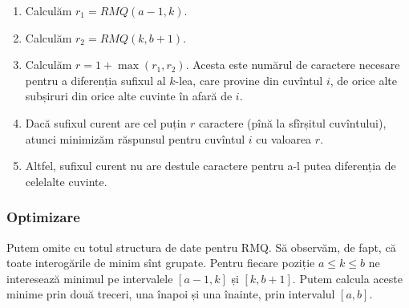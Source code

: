 \documentclass[../main.tex]{subfiles}
\begin{document}
\begin{enumerate}
  \item Calculăm $r_1 = RMQ(a - 1, k)$.

  \item Calculăm $r_2 = RMQ(k, b + 1)$.

  \item Calculăm $r = 1 + \max(r_1, r_2)$. Acesta este numărul de caractere necesare pentru a diferenția sufixul al $k$-lea, care provine din cuvîntul $i$, de orice alte subșiruri din orice alte cuvinte în afară de $i$.

  \item Dacă sufixul curent are cel puțin $r$ caractere (pînă la sfîrșitul cuvîntului), atunci minimizăm răspunsul pentru cuvîntul $i$ cu valoarea $r$.

  \item Altfel, sufixul curent nu are destule caractere pentru a-l putea diferenția de celelalte cuvinte.
\end{enumerate}

\subsubsection*{Optimizare}

Putem omite cu totul structura de date pentru RMQ. Să observăm, de fapt, că toate interogările de minim sînt grupate. Pentru fiecare poziție $a \leq k \leq b$ ne interesează minimul pe intervalele $[a - 1, k]$ și $[k, b + 1]$. Putem calcula aceste minime prin două treceri, una înapoi și una înainte, prin intervalul $[a, b]$.
\end{document}
